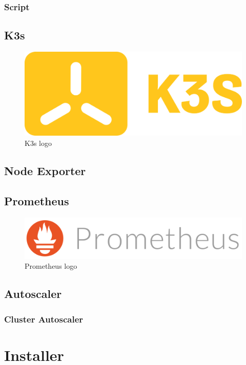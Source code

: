 \subsubsection{Script}
\label{subsec:implementation_dependencies_management_script}

\subsection{K3s}
\label{subsec:implementation_dependencies_k3s}

\begin{figure}
  \centering
  \includegraphics[width=.25\textwidth]{images/logos/k3s.png}
  \caption{K3s logo}
\end{figure}

\subsection{Node Exporter}
\label{subsec:implementation_dependencies_node_exporter}

\subsection{Prometheus}
\label{subsec:implementation_dependencies_prometheus}

\begin{figure}
  \centering
  \includegraphics[width=.25\textwidth]{images/logos/prometheus.png}
  \caption{Prometheus logo}
\end{figure}

\subsection{Autoscaler}
\label{subsec:implementation_dependencies_autoscaler}

\subsubsection{Cluster Autoscaler}
\label{subsec:implementation_dependencies_autoscaler_cluster_autoscaler}

\section{Installer}
\label{sec:implementation_installer}

